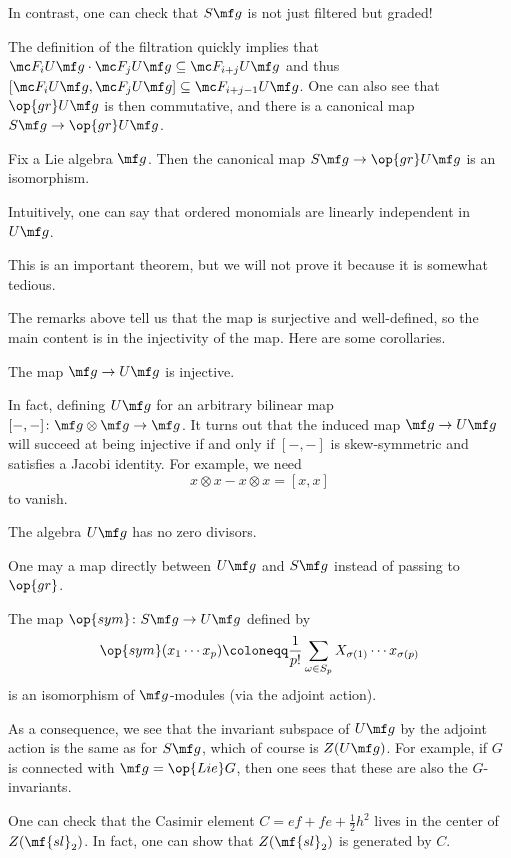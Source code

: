\documentclass[../notes.tex]{subfiles}
\begin{document}
\begin{remark}
	In contrast, one can check that $S\mf g$ is not just filtered but graded!
\end{remark}
The definition of the filtration quickly implies that $\mc F_iU\mf g\cdot\mc F_jU\mf g\subseteq\mc F_{i+j}U\mf g$ and thus $[\mc F_iU\mf g,\mc F_jU\mf g]\subseteq\mc F_{i+j-1}U\mf g$. One can also see that $\op{gr}U\mf g$ is then commutative, and there is a canonical map $S\mf g\to\op{gr}U\mf g$.
\begin{theorem}
	Fix a Lie algebra $\mf g$. Then the canonical map $S\mf g\to\op{gr}U\mf g$ is an isomorphism.
\end{theorem}
\begin{remark}
	Intuitively, one can say that ordered monomials are linearly independent in $U\mf g$.
\end{remark}
This is an important theorem, but we will not prove it because it is somewhat tedious.

The remarks above tell us that the map is surjective and well-defined, so the main content is in the injectivity of the map. Here are some corollaries.
\begin{corollary}
	The map $\mf g\to U\mf g$ is injective.
\end{corollary}
\begin{remark}
	In fact, defining $U\mf g$ for an arbitrary bilinear map $[-,-]\colon\mf g\otimes\mf g\to\mf g$. It turns out that the induced map $\mf g\to U\mf g$ will succeed at being injective if and only if $[-,-]$ is skew-symmetric and satisfies a Jacobi identity. For example, we need
	\[x\otimes x-x\otimes x=[x,x]\]
	to vanish.
\end{remark}
\begin{corollary}
	The algebra $U\mf g$ has no zero divisors.
\end{corollary}
One may a map directly between $U\mf g$ and $S\mf g$ instead of passing to $\op{gr}$.
\begin{proposition}
	The map $\op{sym}\colon S\mf g\to U\mf g$ defined by
	\[\op{sym}(x_1\cdots x_p)\coloneqq\frac1{p!}\sum_{\omega\in S_p}X_{\sigma(1)}\cdots x_{\sigma(p)}\]
	is an isomorphism of $\mf g$-modules (via the adjoint action).
\end{proposition}
\begin{remark}
	As a consequence, we see that the invariant subspace of $U\mf g$ by the adjoint action is the same as for $S\mf g$, which of course is $Z(U\mf g)$. For example, if $G$ is connected with $\mf g=\op{Lie}G$, then one sees that these are also the $G$-invariants.
\end{remark}
\begin{example}
	One can check that the Casimir element $C=ef+fe+\frac12h^2$ lives in the center of $Z(\mf{sl}_2)$. In fact, one can show that $Z(\mf{sl}_2)$ is generated by $C$.
\end{example}
\end{document}
